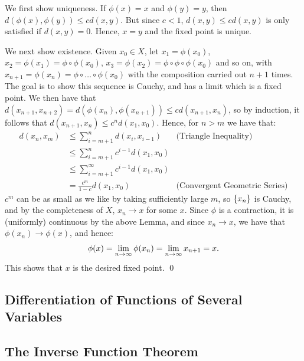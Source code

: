 \begin{nproof}
    We first show uniqueness. If $\phi(x) = x$ and $\phi(y) = y$, then $d(\phi(x), \phi(y)) \leq cd(x, y)$. But since $c < 1$, $d(x, y) \leq cd(x, y)$ is only satisfied if $d(x, y) = 0$. Hence, $x = y$ and the fixed point is unique.

    We next show existence. Given $x_0 \in X$, let $x_1 = \phi(x_0)$, $x_2 = \phi(x_1) = \phi\circ \phi(x_0)$, $x_3 = \phi(x_2) = \phi\circ\phi\circ\phi(x_0)$ and so on, with $x_{n+1} = \phi(x_n) = \phi \circ \ldots \circ \phi(x_0)$ with the composition carried out $n+1$ times. The goal is to show this sequence is Cauchy, and has a limit which is a fixed point. We then have that $d(x_{n+1}, x_{n+2}) = d(\phi(x_n), \phi(x_{n+1})) \leq cd(x_{n+1}, x_n)$, so by induction, it follows that $d(x_{n+1}, x_n) \leq c^nd(x_1, x_0)$. Hence, for $n > m$ we have that:
    \begin{align*}
        d(x_n, x_m) &\leq \sum_{i=m+1}^n d(x_i, x_{i-1}) & \text{(Triangle Inequality)}
        \\ &\leq \sum_{i=m+1}^n c^{i-1}d(x_1, x_0)
        \\ &\leq \sum_{i=m+1}^\infty c^{i-1}d(x_1, x_0)
        \\ &= \frac{c^m}{1-c}d(x_1, x_0) & \text{(Convergent Geometric Series)}
    \end{align*}
    $c^m$ can be as small as we like by taking sufficiently large $m$, so $\set{x_n}$ is Cauchy, and by the completeness of $X$, $x_n \rightarrow x$ for some $x$. Since $\phi$ is a contraction, it is (uniformly) continuous by the above Lemma, and since $x_n \rightarrow x$, we have that $\phi(x_n) \rightarrow \phi(x)$, and hence:
    \begin{align*}
        \phi(x) = \lim_{n \rightarrow \infty} \phi(x_n) = \lim_{n \rightarrow \infty} x_{n+1} = x.
    \end{align*}
    This shows that $x$ is the desired fixed point. \qed
\end{nproof}

\subsection{Differentiation of Functions of Several Variables}

\subsection{The Inverse Function Theorem}

